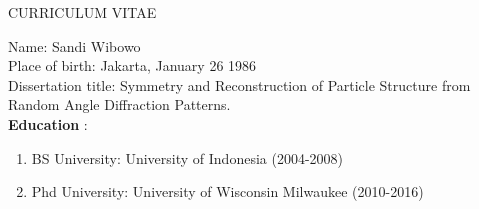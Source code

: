 \newpage
{}

\begin{center}
{\large CURRICULUM VITAE} 
\end{center}
Name: Sandi Wibowo  \\
Place of birth: Jakarta, January 26 1986  \\
Dissertation title: Symmetry and Reconstruction of Particle Structure from Random Angle Diffraction Patterns.  \\
\textbf{Education} : 
\begin{enumerate}
\item BS University: University of Indonesia (2004-2008)
\item Phd University: University of Wisconsin Milwaukee (2010-2016)
\end{enumerate}


